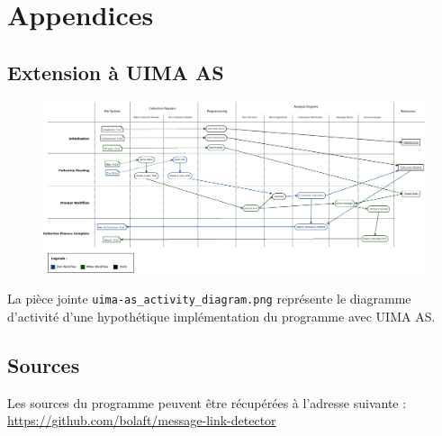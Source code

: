 \documentclass[a4paper]{article}
\begin{document}
\section{Appendices}

\subsection{Extension à UIMA AS}

\begin{figure}[H]
\centering
\includegraphics[width=\textwidth]{./uima-as_activity_diagram.png}
\label{overflow}
\end{figure}

La pièce jointe \texttt{uima-as\_activity\_diagram.png} représente le diagramme d'activité d'une hypothétique implémentation du programme avec UIMA AS.

\subsection{Sources}

Les sources du programme peuvent être récupérées à l'adresse suivante : \url{https://github.com/bolaft/message-link-detector}
\end{document}
